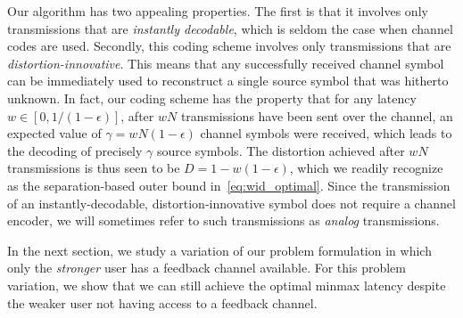 Our algorithm has two appealing properties. The first is that it involves only transmissions that are \emph{instantly decodable}, which is seldom the case when channel codes are used.  
Secondly, this coding scheme involves only transmissions that are \emph{distortion-innovative}.  This means that any successfully received channel symbol can be immediately used to reconstruct a single source symbol that was hitherto unknown.  %
%
In fact, our coding scheme has the property that for any latency $w \in [0, 1/(1 - \epsilon)]$, after $wN$ transmissions have been sent over the channel, an expected value of $\gamma = wN(1 - \epsilon)$ channel symbols were received, which leads to the decoding of precisely $\gamma$ source symbols.  The distortion achieved after $wN$ transmissions is thus seen to be $D = 1 - w(1 - \epsilon)$, which we readily recognize as 
the separation-based outer bound in~\eqref{eq:wid_optimal}.  Since the transmission of an instantly-decodable, distortion-innovative symbol does not require a channel encoder, we will sometimes refer to such transmissions as \emph{analog} transmissions.

In the next section, we study
a variation of our problem formulation in which only the \emph{stronger} user has a feedback channel available.  For this problem variation, we show that we can still achieve the optimal minmax latency despite the weaker user not having access to a feedback channel.





